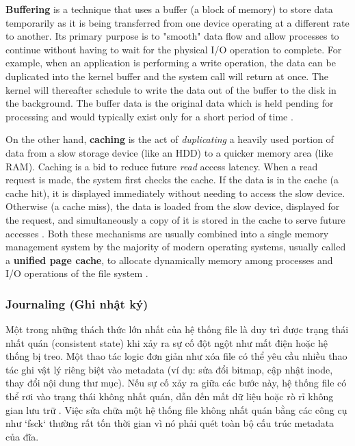 \documentclass[12pt]{article}
\begin{document}
\textbf{Buffering} is a technique that uses a buffer (a block of memory) to store data temporarily as it is being transferred from one device operating at a different rate to another. Its primary purpose is to "smooth" data flow and allow processes to continue without having to wait for the physical I/O operation to complete. For example, when an application is performing a write operation, the data can be duplicated into the kernel buffer and the system call will return at once. The kernel will thereafter schedule to write the data out of the buffer to the disk in the background. The buffer data is the original data which is held pending for processing and would typically exist only for a short period of time \parencite{GeeksForGeeks2025BufferCache}.

On the other hand, \textbf{caching} is the act of \textit{duplicating} a heavily used portion of data from a slow storage device (like an HDD) to a quicker memory area (like RAM). Caching is a bid to reduce future \textit{read} access latency. When a read request is made, the system first checks the cache. If the data is in the cache (a cache hit), it is displayed immediately without needing to access the slow device. Otherwise (a cache miss), the data is loaded from the slow device, displayed for the request, and simultaneously a copy of it is stored in the cache to serve future accesses \parencite{GeeksForGeeks2025BufferCache}. Both these mechanisms are usually combined into a single memory management system by the majority of modern operating systems, usually called a \textbf{unified page cache}, to allocate dynamically memory among processes and I/O operations of the file system \parencite{Silberschatz2018}.

\subsubsection{Journaling (Ghi nhật ký)}
Một trong những thách thức lớn nhất của hệ thống file là duy trì được trạng thái nhất quán (consistent state) khi xảy ra sự cố đột ngột như mất điện hoặc hệ thống bị treo. Một thao tác logic đơn giản như xóa file có thể yêu cầu nhiều thao tác ghi vật lý riêng biệt vào metadata (ví dụ: sửa đổi bitmap, cập nhật inode, thay đổi nội dung thư mục). Nếu sự cố xảy ra giữa các bước này, hệ thống file có thể rơi vào trạng thái không nhất quán, dẫn đến mất dữ liệu hoặc rò rỉ không gian lưu trữ \parencite{LibreTextsJournaling}. Việc sửa chữa một hệ thống file không nhất quán bằng các công cụ như `fsck` thường rất tốn thời gian vì nó phải quét toàn bộ cấu trúc metadata của đĩa.
\end{document}
